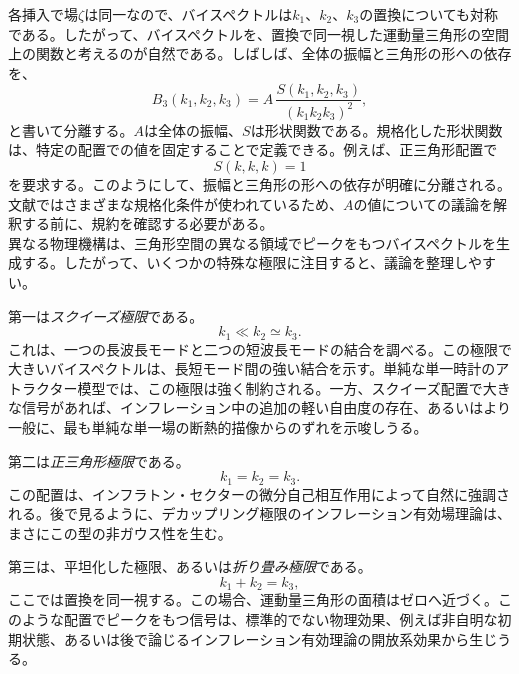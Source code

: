 \documentclass[a4paper,11pt,oneside]{article}
\theoremstyle{definition}
\numberwithin{equation}{section}
\begin{document}
各挿入で場\(\zeta\)は同一なので、バイスペクトルは\(k_1\)、\(k_2\)、\(k_3\)の置換についても対称である。したがって、バイスペクトルを、置換で同一視した運動量三角形の空間上の関数と考えるのが自然である。しばしば、全体の振幅と三角形の形への依存を、
\begin{equation}
B_3(k_1,k_2,k_3)=A\,\frac{S(k_1,k_2,k_3)}{(k_{1}k_{2}k_{3})^{2}} ,
\end{equation}
と書いて分離する。\(A\)は全体の振幅、\(S\)は形状関数である。規格化した形状関数は、特定の配置での値を固定することで定義できる。例えば、正三角形配置で
\begin{equation}
S(k,k,k)=1
\end{equation}
を要求する。このようにして、振幅と三角形の形への依存が明確に分離される。文献ではさまざまな規格化条件が使われているため、$ A  $の値についての議論を解釈する前に、規約を確認する必要がある。\\



異なる物理機構は、三角形空間の異なる領域でピークをもつバイスペクトルを生成する。したがって、いくつかの特殊な極限に注目すると、議論を整理しやすい。



第一は\textit{スクイーズ極限}である。
\begin{equation}
k_1 \ll k_2 \simeq k_3 .
\end{equation}
これは、一つの長波長モードと二つの短波長モードの結合を調べる。この極限で大きいバイスペクトルは、長短モード間の強い結合を示す。単純な単一時計のアトラクター模型では、この極限は強く制約される\cite{Maldacena:2002vr,Creminelli:2004yq,Flauger:2013hra,Creminelli:2011sq,Hinterbichler:2012nm,Hinterbichler:2013dpa,Creminelli:2012ed,Pajer:2013ana,Dai:2015rda,Creminelli:2013cga,Cabass:2016cgp,Pajer:2017hmb,Finelli:2017fml}。一方、スクイーズ配置で大きな信号があれば、インフレーション中の追加の軽い自由度の存在、あるいはより一般に、最も単純な単一場の断熱的描像からのずれを示唆しうる。



第二は\textit{正三角形極限}である。
\begin{equation}
k_1=k_2=k_3 .
\end{equation}
この配置は、インフラトン・セクターの微分自己相互作用によって自然に強調される。後で見るように、デカップリング極限のインフレーション有効場理論は、まさにこの型の非ガウス性を生む。



第三は、平坦化した極限、あるいは\textit{折り畳み極限}である。
\begin{equation}
k_1+k_2=k_3 ,
\end{equation}
ここでは置換を同一視する。この場合、運動量三角形の面積はゼロへ近づく。このような配置でピークをもつ信号は、標準的でない物理効果、例えば非自明な初期状態\cite{Holman:2007na,Agarwal:2012mq}、あるいは後で論じるインフレーション有効理論の開放系効果\cite{LopezNacir:2011kk,Salcedo:2024smn,Salcedo:2026sdn,Green:2020whw,Creminelli:2023aly}から生じうる。
\end{document}
